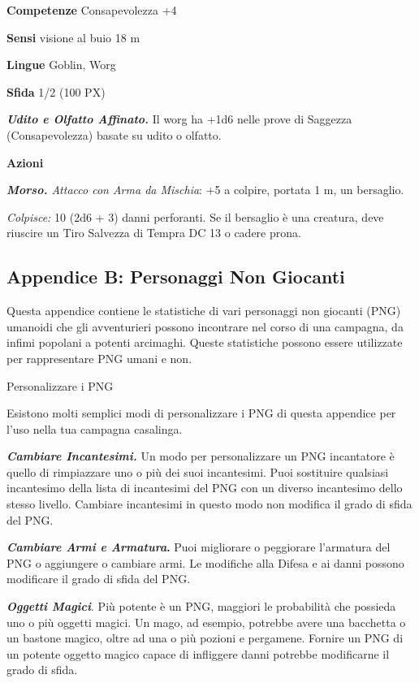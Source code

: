 \begin{multicols}{2}
\textbf{Competenze} Consapevolezza +4

\textbf{Sensi} visione al buio 18 m

\textbf{Lingue} Goblin, Worg

\textbf{Sfida} 1/2 (100 PX)

\textit{\textbf{Udito e Olfatto Affinato.}} Il worg ha +1d6 nelle prove di Saggezza (Consapevolezza) basate su udito o olfatto.

\textbf{Azioni}

\textit{\textbf{Morso.} Attacco con Arma da Mischia}: +5 a colpire, portata 1 m, un bersaglio.

\textit{Colpisce:} 10 (2d6 + 3) danni perforanti. Se il bersaglio è una creatura, deve riuscire un Tiro Salvezza di Tempra DC 13 o cadere prona.

\subsection{Appendice B: Personaggi Non Giocanti}

Questa appendice contiene le statistiche di vari personaggi non giocanti (PNG) umanoidi che gli avventurieri possono incontrare nel corso di una campagna, da infimi popolani a potenti arcimaghi. Queste statistiche possono essere utilizzate per rappresentare PNG umani e non.

Personalizzare i PNG

Esistono molti semplici modi di personalizzare i PNG di questa appendice per l'uso nella tua campagna casalinga.

\textit{\textbf{Cambiare Incantesimi.}} Un modo per personalizzare un PNG incantatore è quello di rimpiazzare uno o più dei suoi incantesimi. Puoi sostituire qualsiasi incantesimo della lista di
incantesimi del PNG con un diverso incantesimo dello stesso livello. Cambiare incantesimi in questo modo non modifica il grado di sfida del PNG.

\textbf{\textit{Cambiare Armi e Armatura}.} Puoi migliorare o peggiorare l'armatura del PNG o aggiungere o cambiare armi. Le modifiche alla Difesa e ai danni possono modificare il grado di sfida del PNG.

\textit{\textbf{Oggetti Magici}}. Più potente è un PNG, maggiori le probabilità che possieda uno o più oggetti magici. Un mago, ad esempio, potrebbe avere una bacchetta o un bastone magico, oltre ad una o più pozioni e pergamene. Fornire un PNG di un potente oggetto magico capace di infliggere danni potrebbe modificarne il grado di sfida.


\end{multicols}
